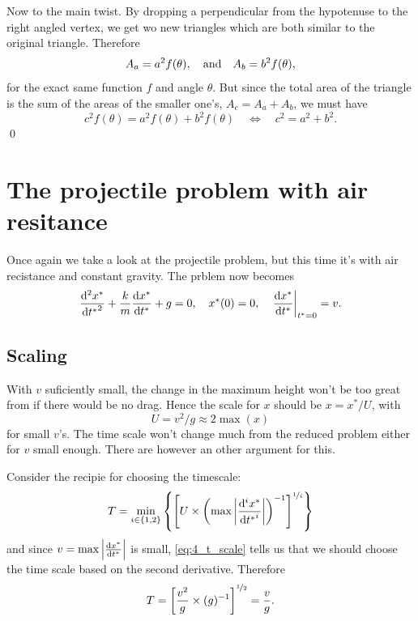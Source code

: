 \documentclass[11pt,letter, swedish, english
]{article}
\begin{document}
Now to the main twist. By dropping a perpendicular from the hypotenuse
to the right angled vertex, we get wo new triangles which are both
similar to the original triangle. Therefore
\begin{equation}
A_a=a^2f(\theta) \qcomma\text{and}\quad A_b=b^2f(\theta),
\end{equation}
for the exact same function $f$ and angle $\theta$. But since the
total area of the triangle is the sum of the areas of the smaller
one's, $A_c=A_a+A_b$, we must have
\begin{equation}
c^2f(\theta)=a^2f(\theta)+b^2f(\theta) \quad\Longleftrightarrow\quad 
c^2=a^2+b^2.
\end{equation}
\qed


\section{The projectile problem with air resitance}
Once again we take a look at the projectile problem, but this time
it's with air recistance and constant gravity. The prblem now becomes
\begin{equation}\label{eq:4_gov_eqn}
\frac{\dd^2{x^*}}{\dd{t^*}^2} + \frac{k}{m}\frac{\dd{x^*}}{\dd{t^*}} + g = 0
\qcomma x^*(0)=0\qcomma \eval{\dv{x^*}{t^*}}_{t^*=0}=v.
\end{equation}

\subsection{Scaling}
With $v$ suficiently small, the change in the maximum height won't be
too great from if there would be no drag. Hence the scale for $x$
should be $x=x^*/U$, with 
\begin{equation}\label{eq:4_xscale}
U=v^2/g\approx2\max(x)
\end{equation}
for small $v$'s. 
The time scale won't change much from the reduced problem either for
$v$ small enough. There are however an other argument for this. 

Consider the recipie for choosing the timescale:
\begin{equation}\label{eq:4_t_scale}
T=\min_{i\in\{1, 2\}}\qty{\qty[
U\times\qty(\max\abs{\frac{\dd^i x^*}{\dd{t^*}^i}})^{-1}
]^{\nicefrac{1}{i}}}
\end{equation}
and since $v=\max\abs{\dv{x^*}{t^*}}$ is small, \eqref{eq:4_t_scale}
tells us that we should choose the time scale based on the second
derivative. Therefore
\begin{equation}\label{eq:4_tscale}
T=\qty[\frac{v^2}{g}\times(g)^{-1}]^{\nicefrac{1}{2}} = \frac{v}{g}.
\end{equation}
\end{document}
